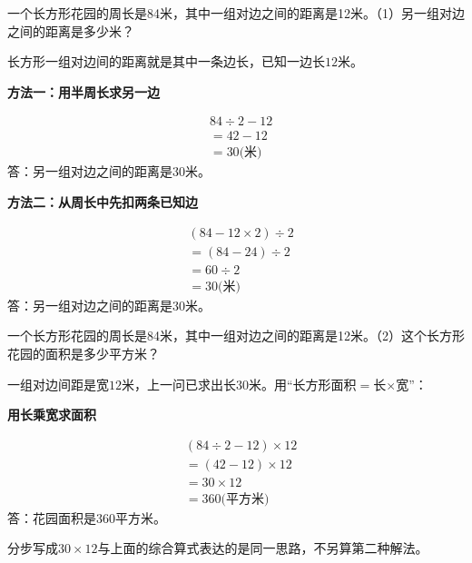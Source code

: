一个长方形花园的周长是84米，其中一组对边之间的距离是12米。（1）另一组对边之间的距离是多少米？\par
\begin{BookAnswer}
长方形一组对边间的距离就是其中一条边长，已知一边长\(12\)米。\par \par\noindent\begin{minipage}{\linewidth}\textbf{方法一：用半周长求另一边}\par \[\begin{aligned}&84\div2-12\\&=42-12\\&=30\text{(米)}\end{aligned}\]答：另一组对边之间的距离是\(30\)米。\end{minipage}\par \par \par\noindent\begin{minipage}{\linewidth}\textbf{方法二：从周长中先扣两条已知边}\par \[\begin{aligned}&(84-12\times2)\div2\\&=(84-24)\div2\\&=60\div2\\&=30\text{(米)}\end{aligned}\]答：另一组对边之间的距离是\(30\)米。\end{minipage}\par
\end{BookAnswer}

一个长方形花园的周长是84米，其中一组对边之间的距离是12米。（2）这个长方形花园的面积是多少平方米？\par
\begin{BookAnswer}
一组对边间距是宽\(12\)米，上一问已求出长\(30\)米。用“长方形面积\(=\)长\(\times\)宽”：\par \noindent\begin{minipage}{\linewidth}\textbf{用长乘宽求面积}\par \[\begin{aligned}&(84\div2-12)\times12\\&=(42-12)\times12\\&=30\times12\\&=360\text{(平方米)}\end{aligned}\]答：花园面积是\(360\)平方米。\end{minipage}\par 分步写成\(30\times12\)与上面的综合算式表达的是同一思路，不另算第二种解法。
\end{BookAnswer}

